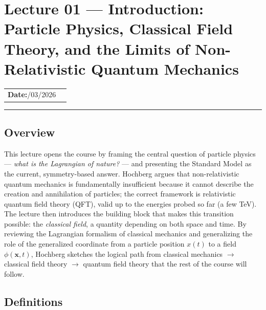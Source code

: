 
\section{Lecture 01 — Introduction: Particle Physics, Classical Field
  Theory, and the Limits of Non-Relativistic Quantum
  Mechanics}\label{sec:lec01}
\begin{center}
\begin{tabular}{ll}
  \textbf{Date:}\quad 22/03/2026   & \\
\end{tabular}
\end{center}
\hrule\vspace{1.5em}
\subsection*{Overview}

This lecture opens the course by framing the central question of
particle physics — \emph{what is the Lagrangian of nature?} — and
presenting the Standard Model as the current, symmetry-based answer.
Hochberg argues that non-relativistic quantum mechanics is fundamentally
insufficient because it cannot describe the creation and annihilation of
particles; the correct framework is relativistic quantum field theory
(QFT), valid up to the energies probed so far (a few TeV).
The lecture then introduces the building block that makes this
transition possible: the \emph{classical field}, a quantity depending on
both space and time.  By reviewing the Lagrangian formalism of classical
mechanics and generalizing the role of the generalized coordinate from a
particle position $x(t)$ to a field $\phi(\mathbf{x}, t)$, Hochberg
sketches the logical path from classical mechanics $\to$ classical field
theory $\to$ quantum field theory that the rest of the course will
follow.

\subsection*{Definitions}

